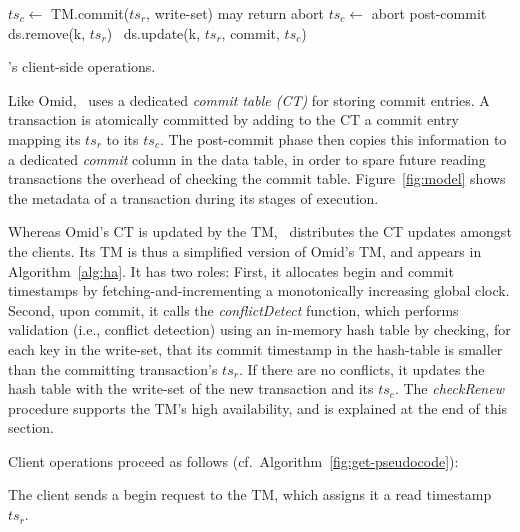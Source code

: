 \begin{algorithm}[t]
\begin{algorithmic}
      	\State $ts_c \leftarrow$ TM.commit($ts_r$, write-set) \Comment may return abort
   		 	\State $ts_c \leftarrow$ abort 
   		 \EndIf
	\EndIf
	\State \Comment post-commit
			 ds.remove(k, $ts_r$)  	
			\Else\ ds.update(k, $ts_r$, commit, $ts_c$)
			\EndIf
	\EndFor
\EndProcedure
      
  \end{algorithmic}
  \caption{\sysll's client-side operations.} 
  \label{fig:get-pseudocode}
\end{algorithm} 

Like Omid, \sysll\ uses a dedicated \emph{commit table (CT)} for storing commit entries.
A transaction is atomically committed by adding to the CT a commit entry mapping its $ts_r$ to its $ts_c$.
The post-commit phase then copies this information to 
a dedicated \emph{commit} column in the data table, in order to spare future reading transactions
 the overhead of checking the commit table. 
 Figure~\ref{fig:model} shows the metadata of a transaction during its stages of execution. 

Whereas Omid's CT is updated by the TM, \sysll\ distributes the CT updates amongst the clients.
Its TM is thus a simplified version of Omid's TM, and appears  in Algorithm~\ref{alg:ha}. It has two roles:
First, it allocates begin and commit timestamps by fetching-and-incrementing a monotonically increasing global clock.
Second, upon commit, it calls the \emph{conflictDetect} function, which 
performs validation (i.e., conflict detection) using an in-memory hash table
by checking, for each key in the write-set, that its commit timestamp in the hash-table is smaller than the 
committing transaction's $ts_r$. If there are no conflicts, it 
updates the hash table with the write-set of the new transaction and its $ts_c$. 
The  \emph{checkRenew} procedure supports the TM's  high availability, and is explained at the end of this section.



\noindent
Client operations proceed as follows (cf.~Algorithm~\ref{fig:get-pseudocode}):

The client sends a begin request to the TM, which assigns it a read timestamp $ts_r$.


